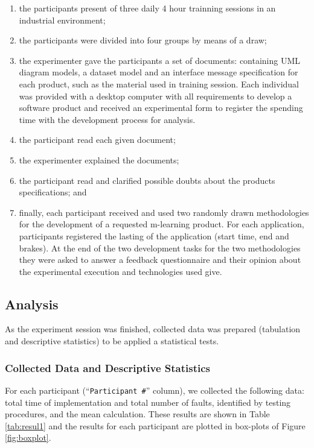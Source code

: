 \begin{enumerate}

\item the participants present of three daily 4 hour trainning sessions in an industrial environment;

\item the participants were divided into four groups by means of a draw;
\item the experimenter gave the participants a set of documents: containing UML diagram models, a dataset model and an interface message specification for each product, such as the material used in training session. Each individual was provided with a desktop computer with all requirements to develop a software product and received an experimental form to register the spending time with the development process for analysis.
\item the participant read each given document;
\item the experimenter explained the documents;
\item the participant read and clarified possible doubts about the products specifications; and
\item finally, each participant received and used two randomly drawn methodologies for the development of a requested m-learning product. For each application, participants registered the lasting of the application (start time, end and brakes). At the end of the two development tasks for the two methodologies they were asked to answer a feedback questionnaire and their opinion about the experimental execution and technologies used give.
\end{enumerate}

\subsection{Analysis}\label{sub:analysis}

As the experiment session was finished, collected data was prepared (tabulation and descriptive statistics) to be applied a statistical tests.

\subsubsection{Collected Data and Descriptive Statistics}

For each participant (``\texttt{Participant \#}'' column), we collected the following data: total time of implementation and total number of faults, identified by testing procedures, and the mean calculation. These results are shown in Table \ref{tab:resul1} and the results for each participant are plotted in box-plots of Figure \ref{fig:boxplot}. 

